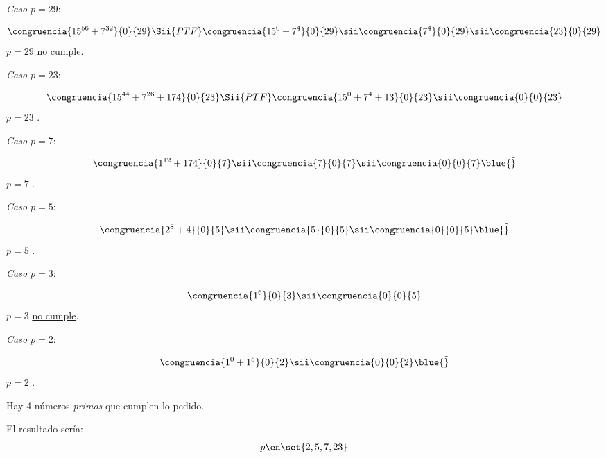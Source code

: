 \begin{enumerate}[label={\tiny \magenta{\faIcon[regular]{gamepad}}}]
  \item
        \textit{Caso $p = 29$}:\par
        $$
          \congruencia{15^{56} + 7^{32} }{0}{29}
          \Sii{PTF}
          \congruencia{15^{0} + 7^{4} }{0}{29}
          \sii
          \congruencia{7^{4}}{0}{29}
          \sii
          \congruencia{23}{0}{29}
        $$
        $p = 29$ \underline{no cumple}.

  \item
        \textit{Caso $p = 23$}:\par
        $$
          \congruencia{15^{44} + 7^{26} + 174 }{0}{23}
          \Sii{PTF}
          \congruencia{15^0 + 7^4 + 13}{0}{23}
          \sii
          \congruencia{0}{0}{23}
        $$
        $p = 23$ .

  \item
        \textit{Caso $p = 7$}:\par
        $$
          \congruencia{1^{12} + 174}{0}{7}
          \sii
          \congruencia{7}{0}{7}
          \sii
          \congruencia{0}{0}{7} \blue{\Tilde}
        $$
        $p = 7$ .

  \item

        \textit{Caso $p = 5$}:\par
        $$
          \congruencia{ 2^8 + 4}{0}{5}
          \sii
          \congruencia{5}{0}{5}
          \sii
          \congruencia{0}{0}{5} \blue{\Tilde}
        $$
        $p = 5$ .

  \item
        \textit{Caso $p = 3$}:\par
        $$
          \congruencia{1^6}{0}{3}
          \sii
          \congruencia{0}{0}{5}
        $$
        $p = 3$ \underline{no cumple}.

  \item
        \textit{Caso $p = 2$}:\par
        $$
          \congruencia{1^0 + 1^5}{0}{2}
          \sii
          \congruencia{0}{0}{2} \blue{\Tilde}
        $$
        $p = 2$ .
\end{enumerate}

Hay 4 números \textit{primos} que cumplen lo pedido.

\bigskip

El resultado sería:
$$
  p \en \set{2, 5, 7, 23}
$$

\begin{aportes}
  \item {}
\end{aportes}
